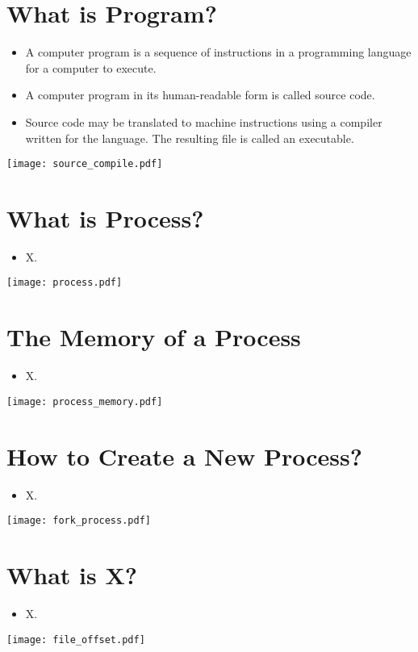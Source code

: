 \documentclass[en,hazy,blue,screen,14pt]{elegantnote}
\begin{document}
\newpage
\section{What is Program?}
\begin{itemize}
	\item A computer program is a sequence of instructions in a programming language for a computer to execute.
	\item A computer program in its human-readable form is called source code. 
	\item Source code may be translated to machine instructions using a compiler written for the language. The resulting file is called an executable.
\end{itemize}

\centerline{\texttt{[image: source\_compile.pdf]}}

\newpage
\section{What is Process?}
\begin{itemize}
	\item X.
\end{itemize}
\centerline{\texttt{[image: process.pdf]}}

\newpage
\section{The Memory of a Process}
\begin{itemize}
	\item X.
\end{itemize}
\centerline{\texttt{[image: process\_memory.pdf]}}


\newpage
\section{How to Create a New Process?}
\begin{itemize}
	\item X.
\end{itemize}
\centerline{\texttt{[image: fork\_process.pdf]}}


\newpage
\section{What is X?}
\begin{itemize}
	\item X.
\end{itemize}
\centerline{\texttt{[image: file\_offset.pdf]}}
\end{document}
